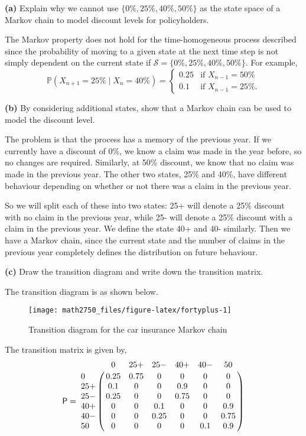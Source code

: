 \documentclass[
  a4paper,
]{article}
\theoremstyle{definition}
\theoremstyle{definition}
\theoremstyle{definition}
\theoremstyle{remark}
\begin{document}
\textbf{(a)} Explain why we cannot use \(\{0\%,25\%,40\%,50\%\}\) as the state space of a Markov chain to model discount levels for policyholders.

\begin{myanswers}

The Markov property does not hold for the time-homogeneous process described since the probability of moving to a given state at the next time step is not simply dependent on the current state if \(\mathcal S=\{0\%,25\%,40\%,50\%\}\). For example,
\[
    \mathbb P(X_{n+1}=25\% \mid X_n= 40\% )=\begin{cases} 
    0.25 & \text{if $X_{n-1}=50\%$}\\
    0.1 & \text{if $X_{n-1}=25\%$.} \end{cases} \]

\end{myanswers}

\textbf{(b)} By considering additional states, show that a Markov chain can be used to model the discount level.

\begin{myanswers}

The problem is that the process has a memory of the previous year.
If we currently have a discount of 0\%, we know a claim was made in the year before, so no changes are required. Similarly, at 50\% discount, we know that no claim was made in the previous year. The other two states, 25\% and 40\%, have different behaviour depending on whether or not there was a claim in the previous year.

So we will split each of these into two states: 25+ will denote a 25\% discount with no claim in the previous year, while 25- will denote a 25\% discount with a claim in the previous year. We define the state 40+ and 40- similarly. Then we have a Markov chain, since the current state and the number of claims in the previous year completely defines the distribution on future behaviour.

\end{myanswers}

\textbf{(c)} Draw the transition diagram and write down the transition matrix.

\begin{myanswers}

The transition diagram is as shown below.

\begin{figure}

{\centering \texttt{[image: math2750\_files/figure-latex/fortyplus-1]} 

}

\caption{Transition diagram for the car insurance Markov chain}\label{fig:fortyplus}
\end{figure}

The transition matrix is given by,
\[ \mathsf P = 
    \bordermatrix{ & 0 & 25+ & 25- & 40+ & 40- & 50 \cr
    0   & 0.25 & 0.75 & 0 & 0 &0 & 0 \cr
    25+ & 0.1 & 0 & 0 & 0.9 &0 & 0\cr
    25- & 0.25 & 0 & 0 & 0.75 &0 & 0\cr
    40+ & 0 & 0 & 0.1 & 0 & 0 &0.9 \cr
    40- & 0 & 0 & 0.25 & 0 & 0 &0.75 \cr
    50  & 0 & 0 & 0 & 0 & 0.1 & 0.9 }
    \]

\end{myanswers}
\end{document}
